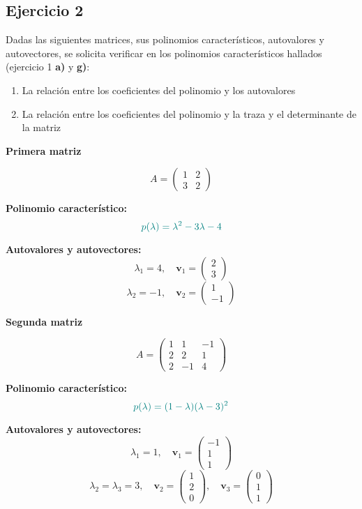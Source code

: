 \documentclass{article}
\begin{document}
\newpage


\subsection{Ejercicio 2}
Dadas las siguientes matrices, sus polinomios característicos, autovalores y autovectores, se solicita verificar en los polinomios característicos hallados (ejercicio 1 \textbf{a)} y \textbf{g)}:

\begin{enumerate}
  \item La relación entre los coeficientes del polinomio y los autovalores
  \item La relación entre los coeficientes del polinomio y la traza y el determinante de la matriz
\end{enumerate}

\bigskip

\textbf{Primera matriz}

\[
A =
\begin{pmatrix}
1 & 2\\
3 & 2
\end{pmatrix}
\]

\textbf{Polinomio característico:}
\[
\color{teal}
p(\lambda) = \lambda^2 - 3\lambda - 4
\]

\textbf{Autovalores y autovectores:}
\[
\lambda_1 = 4,
\quad
\mathbf{v}_1 =
\begin{pmatrix}
2\\
3
\end{pmatrix}
\]
\[
\lambda_2 = -1,
\quad
\mathbf{v}_2 =
\begin{pmatrix}
1\\
-1
\end{pmatrix}
\]

\bigskip

\textbf{Segunda matriz}

\[
A =
\begin{pmatrix}
1 & 1 & -1\\
2 & 2 & 1\\
2 & -1 & 4
\end{pmatrix}
\]

\textbf{Polinomio característico:}
\[
\color{teal}
p(\lambda) = (1-\lambda)(\lambda-3)^2
\]

\textbf{Autovalores y autovectores:}
\[
\lambda_1 = 1,
\quad
\mathbf{v}_1 =
\begin{pmatrix}
-1\\
1\\
1
\end{pmatrix}
\]
\[
\lambda_2 = \lambda_3 = 3,
\quad
\mathbf{v}_2 =
\begin{pmatrix}
1\\
2\\
0
\end{pmatrix},
\quad
\mathbf{v}_3 =
\begin{pmatrix}
0\\
1\\
1
\end{pmatrix}
\]
\end{document}
